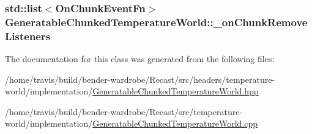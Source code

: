 \hypertarget{class_generatable_chunked_temperature_world_a4f5ce92a800ce903982033724d025e09}{
\subsubsection[{\-\_\-on\-Chunk\-Remove\-Listeners}]{\setlength{\rightskip}{0pt plus 5cm}std\-::list$<${\bf On\-Chunk\-Event\-Fn}$>$ Generatable\-Chunked\-Temperature\-World\-::\-\_\-on\-Chunk\-Remove\-Listeners\hspace{0.3cm}{\ttfamily [protected]}}}\label{class_generatable_chunked_temperature_world_a4f5ce92a800ce903982033724d025e09}


The documentation for this class was generated from the following files\-:\begin{DoxyCompactItemize}
\item 
/home/travis/build/bender-\/wardrobe/\-Recast/src/headers/temperature-\/world/implementation/\hyperlink{_generatable_chunked_temperature_world_8hpp}{Generatable\-Chunked\-Temperature\-World.\-hpp}\item 
/home/travis/build/bender-\/wardrobe/\-Recast/src/temperature-\/world/implementation/\hyperlink{_generatable_chunked_temperature_world_8cpp}{Generatable\-Chunked\-Temperature\-World.\-cpp}\end{DoxyCompactItemize}
